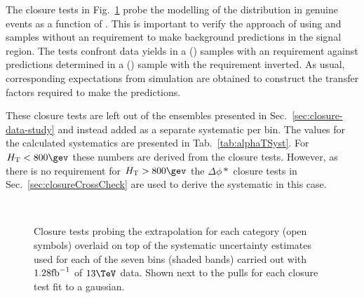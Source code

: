The closure tests in Fig.~\ref{fig:closureAlphaT} probe the
modelling of the \alphat distribution in genuine \met events as a
function of \scalht. This is important to verify the approach of using
\mj and \mmj samples without an \alphat requirement to
make background predictions in the signal region. The tests confront
data yields in a \mj (\mmj) samples with an \alphat requirement against
predictions determined in a \mj (\mmj) sample with the \alphat requirement
inverted. As usual, corresponding expectations from simulation are
obtained to construct the transfer factors required to make the
predictions.

These closure tests are left out of the ensembles presented in
Sec.~\ref{sec:closure-data-study} and instead added as a separate
systematic per \scalht bin. The values for the calculated systematics
are presented in Tab.~\ref{tab:alphaTSyst}. For $\scalht<800\gev$
these numbers are derived from the \alphat closure tests. However, as
there is no \alphat requirement for $\scalht>800\gev$ the $\Delta\phi
*$ closure tests in Sec.~\ref{sec:closureCrossCheck} are used to
derive the systematic in this case.

\begin{figure}[h!]
  \begin{center}
    ~~
    \caption{Closure tests probing the \alphat extrapolation for each
    \njet category (open symbols) overlaid on top of
      the systematic uncertainty estimates used for each of the seven
      \scalht bins (shaded bands) carried out with $1.28\text{fb}^{-1}$ of
      $13\tev$ data. Shown next to the pulls for each closure test fit
      to a gaussian.}
    \label{fig:closureAlphaT}
  \end{center} 
\end{figure}

